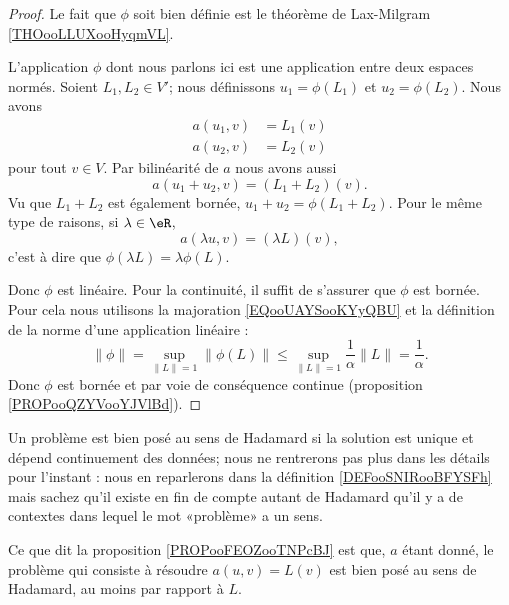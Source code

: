 \begin{proof}
    Le fait que \( \phi\) soit bien définie est le théorème de Lax-Milgram \ref{THOooLLUXooHyqmVL}.

    L'application \( \phi\) dont nous parlons ici est une application entre deux espaces normés. Soient \( L_1,L_2\in V'\); nous définissons \( u_1=\phi(L_1)\) et \( u_2=\phi(L_2)\). Nous avons 
    \begin{subequations}
        \begin{align}
            a(u_1,v)&=L_1(v)\\
            a(u_2,v)&=L_2(v)
        \end{align}
    \end{subequations}
    pour tout $v\in V$. Par bilinéarité de \( a\) nous avons aussi 
    \begin{equation}
        a(u_1+u_2,v)=(L_1+L_2)(v).
    \end{equation}
    Vu que \( L_1+L_2\) est également bornée, \( u_1+u_2=\phi(L_1+L_2)\). Pour le même type de raisons, si \( \lambda\in \eR\),
    \begin{equation}
        a(\lambda u,v)=(\lambda L)(v),
    \end{equation}
    c'est à dire que \( \phi(\lambda L)=\lambda \phi(L)\).

    Donc \( \phi\) est linéaire. Pour la continuité, il suffit de s'assurer que \( \phi\) est bornée. Pour cela nous utilisons la majoration \eqref{EQooUAYSooKYyQBU} et la définition de la norme d'une application linéaire :
    \begin{equation}
        \| \phi \|=\sup_{\| L \|=1}\| \phi(L) \|\leq \sup_{\| L \|=1}\frac{1}{ \alpha }\| L \|=\frac{1}{ \alpha }.
    \end{equation}
    Donc \( \phi\) est bornée et par voie de conséquence continue (proposition \ref{PROPooQZYVooYJVlBd}).
\end{proof}

Un problème est bien posé au sens de Hadamard si la solution est unique et dépend continuement des données; nous ne rentrerons pas plus dans les détails pour l'instant : nous en reparlerons dans la définition \ref{DEFooSNIRooBFYSFh} mais sachez qu'il existe en fin de compte autant de Hadamard qu'il y a de contextes dans lequel le mot «problème» a un sens.

Ce que dit la proposition \ref{PROPooFEOZooTNPcBJ} est que, \( a\) étant donné, le problème qui consiste à résoudre \( a(u,v)=L(v)\) est bien posé au sens de Hadamard, au moins par rapport à \( L\).

